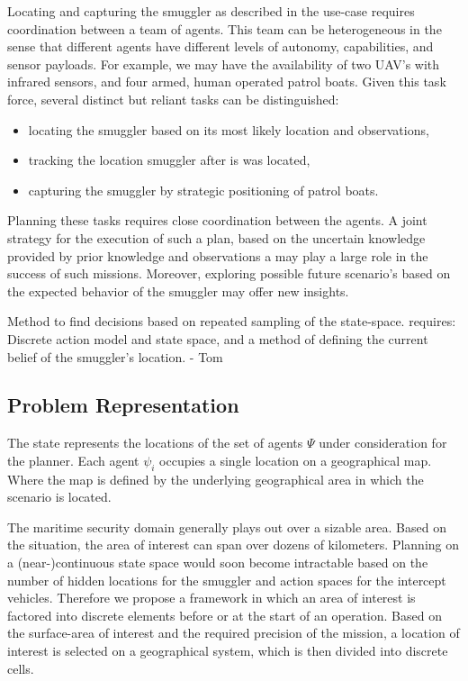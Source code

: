\documentclass[conference]{IEEEtran}
\begin{document}
Locating and capturing the smuggler as described in the use-case requires coordination between a team of agents. This team can be heterogeneous in the sense that different agents have different levels of autonomy, capabilities, and sensor payloads. For example, we may have the availability of two UAV's with infrared sensors, and four armed, human operated patrol boats. Given this task force, several distinct but reliant tasks can be distinguished:
\begin{itemize}
\item locating the smuggler based on its most likely location and observations,
\item tracking the location smuggler after is was located,
\item capturing the smuggler by strategic positioning of patrol boats.
\end{itemize}
Planning these tasks requires close coordination between the agents. A joint strategy for the execution of such a plan, based on the uncertain knowledge provided by prior knowledge and observations a may play a large role in the success of such missions. Moreover, exploring possible future scenario's based on the expected behavior of the smuggler may offer new insights.



{\red Method to find decisions based on repeated sampling of the state-space. requires: Discrete action model and state space, and a method of defining the current belief of the smuggler's location. - Tom}

\subsection{Problem Representation}
\label{sub:problem-rep}

The state represents the locations of the set of agents $\Psi$ under consideration for the planner. Each agent $\psi_i$ occupies a single location on a geographical map. Where the map is defined by the underlying geographical area in which the scenario is located.

The maritime security domain generally plays out over a sizable area. Based on the situation, the area of interest can span over  dozens of kilometers. Planning on a (near-)continuous state space would soon become intractable based on the number of hidden locations for the smuggler and action spaces for the intercept vehicles. Therefore we propose a framework in which an area of interest is factored into discrete elements before or at the start of an operation. Based on the surface-area of interest and the required precision of the mission, a location of interest is selected on a geographical system, which is then divided into discrete cells.
\end{document}
